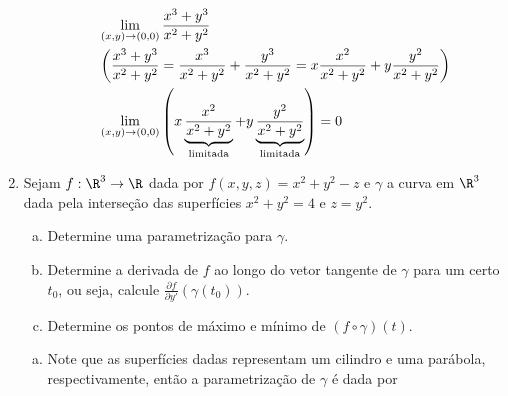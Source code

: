 \documentclass[11pt, oneside, a4paper]{gsm-l}
\begin{document}
\begin{enumerate}
\begin{enumerate}[(a)]
\begin{sol}
\[
\begin{gathered}
  \mathop {\lim }\limits_{\left( {x,y} \right) \to \left( {0,0} \right)} \frac{{x^3  + y^3 }}
{{x^2  + y^2 }} \hfill \\
  \left( {\frac{{x^3  + y^3 }}
{{x^2  + y^2 }} = \frac{{x^3 }}
{{x^2  + y^2 }} + \frac{{y^3 }}
{{x^2  + y^2 }} = x\frac{{x^2 }}
{{x^2  + y^2 }} + y\frac{{y^2 }}
{{x^2  + y^2 }}} \right) \hfill \\
  \mathop {\lim }\limits_{\left( {x,y} \right) \to \left( {0,0} \right)} \left( {x\underbrace {\frac{{x^2 }}
{{x^2  + y^2 }}}_{{\text{limitada}}} + y\underbrace {\frac{{y^2 }}
{{x^2  + y^2 }}}_{{\text{limitada}}}} \right) = 0 \hfill \\
\end{gathered}
\]

\end{sol}

\end{enumerate}

\item Sejam $f:\R^3 \to \R$ dada por $f(x,y,z)=x^2+y^2-z$ e $\gamma$ a curva em $\R^3$ dada pela interse\c{c}ão das superfícies $x^2+y^2=4$ e $z=y^2$.

\begin{enumerate}[(a)]
	\item Determine uma parametriza\c{c}ão para $\gamma$.

	\item Determine a derivada de $f$ ao longo do vetor tangente de $\gamma$ para um certo $t_0$, ou seja, calcule $\displaystyle \frac{{\partial f}}{{\partial y'}}\left( {\gamma \left( {t_0 } \right)} \right)$.

	\item Determine os pontos de máximo e mínimo de $\left( {f \circ \gamma } \right)\left( t \right)$.

\end{enumerate}

\begin{sol}
\begin{enumerate}[(a)]
  \item Note que as superfícies dadas representam um cilindro e uma parábola, respectivamente, então a parametriza\c{c}ão de $\gamma$ é dada por


\end{enumerate}
\end{sol}
\end{enumerate}
\end{document}
